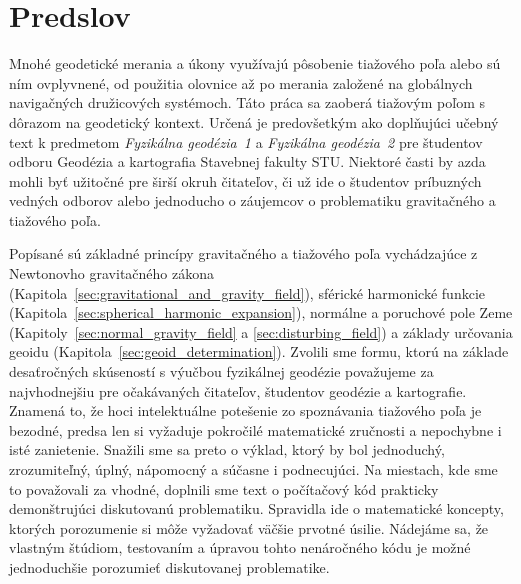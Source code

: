 \documentclass[a4paper, 12pt]{book}
\begin{document}
\tableofcontents
\newpage







\chapter*{Predslov}

Mnohé geodetické merania a úkony využívajú pôsobenie tiažového poľa alebo sú 
ním ovplyvnené, od použitia olovnice až po merania založené na globálnych 
navigačných družicových systémoch.  Táto práca sa zaoberá tiažovým poľom 
s dôrazom na geodetický kontext.  Určená je predovšetkým ako doplňujúci učebný 
text k predmetom \emph{Fyzikálna geodézia~1} a \emph{Fyzikálna geodézia~2} pre 
študentov odboru Geodézia a kartografia Stavebnej fakulty STU.  Niektoré časti 
by azda mohli byť užitočné pre širší okruh čitateľov, či už ide o študentov 
príbuzných vedných odborov alebo jednoducho o záujemcov o problematiku 
gravitačného a tiažového poľa.

Popísané sú základné princípy gravitačného a tiažového poľa vychádzajúce 
z Newtonovho gravitačného zákona 
(Kapitola~\ref{sec:gravitational_and_gravity_field}), sférické harmonické 
funkcie (Kapitola~\ref{sec:spherical_harmonic_expansion}), normálne a poruchové 
pole Zeme (Kapitoly~\ref{sec:normal_gravity_field} 
a \ref{sec:disturbing_field}) a základy určovania geoidu 
(Kapitola~\ref{sec:geoid_determination}).  Zvolili sme formu, ktorú na základe 
desaťročných skúseností s výučbou fyzikálnej geodézie považujeme za 
najvhodnejšiu pre očakávaných čitateľov, študentov geodézie a kartografie.  
Znamená to, že hoci intelektuálne potešenie zo spoznávania tiažového poľa je 
bezodné, predsa len si vyžaduje pokročilé matematické zručnosti a nepochybne 
i isté zanietenie.  Snažili sme sa preto o výklad, ktorý by bol jednoduchý, 
zrozumiteľný, úplný, nápomocný a súčasne i podnecujúci.  Na miestach, kde sme 
to považovali za vhodné, doplnili sme text o počítačový kód prakticky 
demonštrujúci diskutovanú problematiku.  Spravidla ide o matematické koncepty, 
ktorých porozumenie si môže vyžadovať väčšie prvotné úsilie.  Nádejáme sa, že 
vlastným štúdiom, testovaním a úpravou tohto nenáročného kódu je možné 
jednoduchšie porozumieť diskutovanej problematike.
\end{document}
